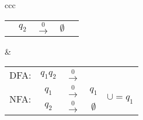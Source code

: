 \documentclass[
	final,
	a4paper,
	oneside,
	parskip=full,
	headings=standardclasses,
	headings=big,
	pointednumbers
]{scrartcl}
\begin{document}
\begin{tabular}{ccc}
\begin{tabular}{l|ccc|c}
                                     & $q_2$    & $\xrightarrow{0}$ & $\emptyset$ \\
            \cline{2-4}
        \end{tabular} &
        \begin{tabular}{l|ccc|c} 
            \multicolumn{1}{c}{DFA:} & $q_1q_2$ & $\xrightarrow{0}$ & \multicolumn{1}{c}{} &\\  
            \cline{2-4}
            \multirow{2}{*}{NFA:}    & $q_1$    & $\xrightarrow{0}$ & $q_1$ & \multirow{2}{*}{$\cup = q_1$} \\
                                     & $q_2$    & $\xrightarrow{0}$ & $\emptyset$ \\
            \cline{2-4}
        \end{tabular}
    \end{tabular}
    
\end{document}
